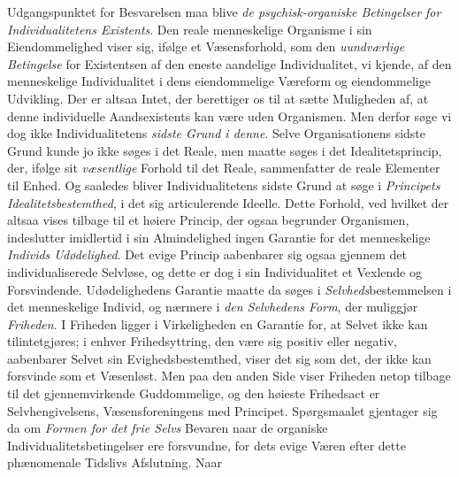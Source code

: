 Udgangspunktet for Besvarelsen maa blive \emph{de psychisk-organiske Betingelser
for Individualitetens Existents}. Den reale menneskelige Organisme i sin
Eiendommelighed viser sig, ifølge et Væsensforhold, som den \emph{uundværlige
Betingelse} for Existentsen af den eneste aandelige Individualitet, vi kjende, af
den menneskelige Individualitet i dens eiendommelige Væreform og eiendommelige
Udvikling. Der er altsaa Intet, der berettiger os til at sætte Muligheden af, at
denne individuelle Aandsexistents kan være uden Organismen. Men derfor søge vi dog
ikke Individualitetens \emph{sidste Grund i denne}. Selve Organisationens sidste
Grund kunde jo ikke søges i det Reale, men maatte søges i det Idealitetsprincip,
der, ifølge sit \emph{væsentlige} Forhold til det Reale, sammenfatter de reale
Elementer til Enhed. Og saaledes bliver Individualitetens sidste Grund
 at søge i \emph{Principets Idealitetsbestemthed}, i det sig articulerende Ideelle.
Dette Forhold, ved hvilket der altsaa vises tilbage til et høiere Princip, der
ogsaa begrunder Organismen, indeslutter imidlertid i sin Almindelighed ingen
Garantie for det menneskelige \emph{Individs Udødelighed}. Det evige Princip
aabenbarer sig ogsaa gjennem det individualiserede Selvløse, og dette er dog i sin
Individualitet et Vexlende og Forsvindende. Udødelighedens Garantie maatte da
søges i \emph{Selvheds}bestemmelsen i det menneskelige Individ, og nærmere i
\emph{den Selvhedens Form}, der muliggjør \emph{Friheden}. I Friheden ligger i
Virkeligheden en Garantie for, at Selvet ikke kan tilintetgjøres; i enhver
Frihedsyttring, den være sig positiv eller negativ, aabenbarer Selvet sin
Evighedsbestemthed, viser det sig som det, der ikke kan forsvinde som et
Væsenløst. Men paa den anden Side viser Friheden netop tilbage til det
gjennemvirkende Guddommelige, og den høieste Frihedsact er Selvhengivelsens,
Væsensforeningens med Principet. Spørgsmaalet gjentager sig da om \emph{Formen for
det frie Selvs} Bevaren naar de organiske Individualitetsbetingelser ere
forsvundne, for dets evige Væren efter dette phænomenale Tidslivs Afslutning. Naar
